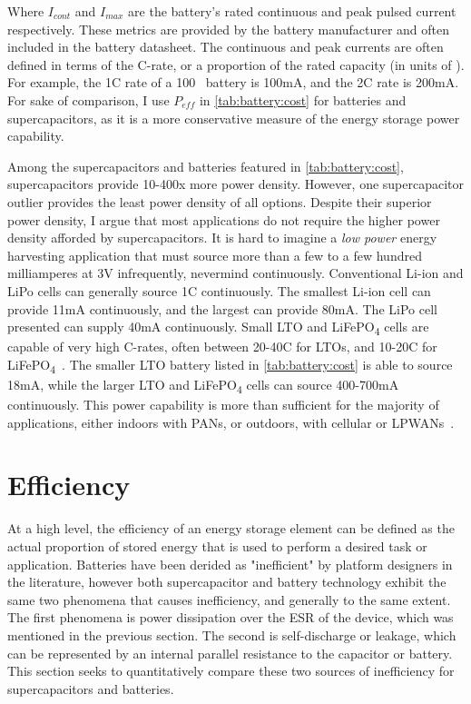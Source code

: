 Where $I_{cont}$ and $I_{max}$ are the battery's rated continuous and peak pulsed current respectively. These metrics are provided by the battery manufacturer and often included in the battery datasheet. The continuous and peak currents are often defined in terms of the C-rate, or a proportion of the rated capacity (in units of \si{\Ah}). For example, the 1C rate of a 100\si{\milli\Ah} battery is 100\si{\milli\ampere}, and the 2C rate is 200\si{\milli\ampere}. For sake of comparison, I use $P_{eff}$ in \cref{tab:battery:cost} for batteries and supercapacitors, as it is a more conservative measure of the energy storage power capability. 

Among the supercapacitors and batteries featured in \cref{tab:battery:cost}, supercapacitors provide 10-400x more power density. However, one supercapacitor outlier provides the least power density of all options. Despite their superior power density, I argue that most applications do not require the higher power density afforded by supercapacitors. It is hard to imagine a \textit{low power} energy harvesting application that must source more than a few to a few hundred milliamperes at 3\si{\volt} infrequently, nevermind continuously.
Conventional Li-ion and LiPo cells can generally source 1C continuously. The smallest Li-ion cell can provide 11\si{\milli\ampere} continuously, and the largest can provide 80\si{\milli\ampere}. The LiPo cell presented can supply 40\si{\milli\ampere} continuously. 
Small LTO and LiFePO\textsubscript{4} cells are capable of very high C-rates, often between 20-40C for LTOs, and 10-20C for LiFePO\textsubscript{4}~\cite{lifepo4Datasheet,LTODatasheet,LTODatasheet2}.
The smaller LTO battery listed in \cref{tab:battery:cost} is able to source 18\si{\milli\ampere}, while the larger LTO and LiFePO\textsubscript{4} cells can source 400-700\si{\milli\ampere} continuously. 
This power capability is more than sufficient for the majority of applications, either indoors with PANs, or outdoors, with cellular or LPWANs~\cite{nrf52840,ghena2019challenge}.


\section{Efficiency}
\label{sec:supercapvbattery}
At a high level, the efficiency of an energy storage element can be defined as the actual proportion of stored energy that is used to perform a desired task or application. Batteries have been derided as "inefficient" by platform designers in the literature, however
both supercapacitor and battery technology exhibit the same two phenomena that causes inefficiency, and generally to the same extent. The first phenomena is power dissipation over the ESR of the device, which was mentioned in the previous section. The second is self-discharge or leakage, which can be represented by an internal parallel resistance to the capacitor or battery.
This section seeks to quantitatively compare these two sources of inefficiency for supercapacitors and batteries.

